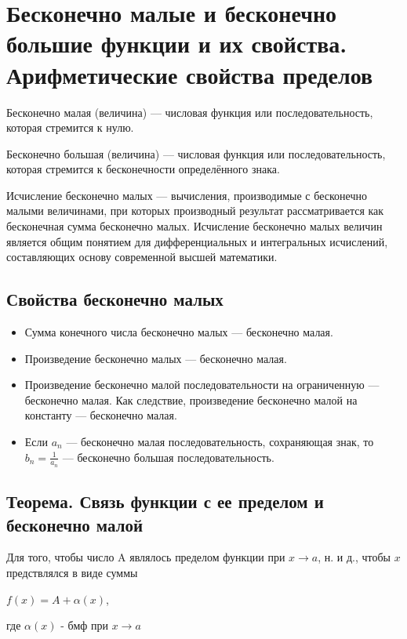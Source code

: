 \section{Бесконечно малые и бесконечно большие функции и их свойства. Арифметические свойства пределов}

Бесконечно малая (величина) — числовая функция или последовательность, которая стремится к нулю.

Бесконечно большая (величина) — числовая функция или последовательность, которая стремится к бесконечности определённого знака.

Исчисление бесконечно малых — вычисления, производимые с бесконечно малыми величинами, при которых производный результат рассматривается как бесконечная сумма бесконечно малых. Исчисление бесконечно малых величин является общим понятием для дифференциальных и интегральных исчислений, составляющих основу современной высшей математики.

\subsection{Свойства бесконечно малых}

\begin{itemize}
\item 
Сумма конечного числа бесконечно малых — бесконечно малая.

\item 
Произведение бесконечно малых — бесконечно малая.

\item 
Произведение бесконечно малой последовательности на ограниченную — бесконечно малая. Как следствие, произведение бесконечно малой на константу — бесконечно малая.

\item 
Если $a_n$ — бесконечно малая последовательность, сохраняющая знак, то $b_n=\frac{1}{a_n}$ — бесконечно большая последовательность.
\end{itemize}


\subsection{Теорема. Связь функции с ее пределом и бесконечно малой}

Для того, чтобы число A являлось пределом функции при $ x \to a $, н. и д., чтобы $ x $ предствлялся в виде суммы

$ f(x) = A + \alpha(x) $,

где $ \alpha(x) $ - бмф при $ x \to a $


